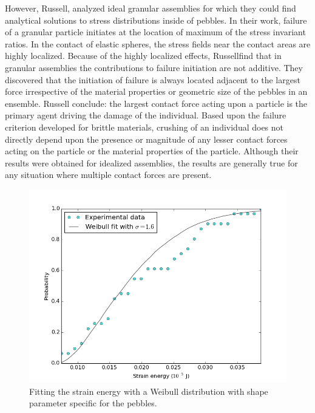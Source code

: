However, Russell\etal, analyzed ideal granular assemblies for which they could find analytical solutions to stress distributions inside of pebbles.\cite{Russell2009} In their work, failure of a granular particle initiates at the location of maximum of the stress invariant ratios. In the contact of elastic spheres, the stress fields near the contact areas are highly localized. Because of the highly localized effects, Russell\etal find that in granular assemblies the contributions to failure initiation are not additive. They discovered that the initiation of failure is always located adjacent to the largest force irrespective of the material properties or geometric size of the pebbles in an ensemble. Russell\etal\cite{Russell2009} conclude: the largest contact force acting upon a particle is the primary agent driving the damage of the individual. Based upon the failure criterion developed for brittle materials, crushing of an individual does not directly depend upon the presence or magnitude of any lesser contact forces acting on the particle or the material properties of the particle. Although their results were obtained for idealized assemblies, the results are generally true for any situation where multiple contact forces are present.

\begin{figure}[!t]
\centering
    \includegraphics[width=\doubleimagewidth]{chapters/figures/fzk-w-cdf-fit.png}
    \caption{Fitting the strain energy with a Weibull distribution with shape parameter specific for the \lis pebbles.}
    \label{fig:fzk-w-cdf}
\end{figure}

